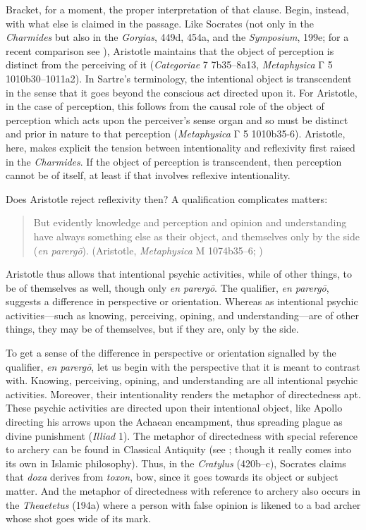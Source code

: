 Bracket, for a moment, the proper interpretation of that clause. Begin, instead, with what else is claimed in the passage. Like Socrates (not only in the \emph{Charmides} but also in the \emph{Gorgias}, 449d, 454a, and the \emph{Symposium}, 199e; for a recent comparison see \citealt[chapter 2]{Moss:2021aa}), Aristotle maintains that the object of perception is distinct from the perceiving of it (\emph{Categoriae} 7 7b35–8a13, \emph{Metaphysica} {\sbl Γ} 5 1010b30–1011a2). In Sartre's terminology, the intentional object is transcendent in the sense that it goes beyond the conscious act directed upon it. For Aristotle, in the case of perception, this follows from the causal role of the object of perception which acts upon the perceiver's sense organ and so must be distinct and prior in nature to that perception (\emph{Metaphysica} {\sbl Γ} 5 1010b35-6). Aristotle, here, makes explicit the tension between intentionality and reflexivity first raised in the \emph{Charmides}. If the object of perception is transcendent, then perception cannot be of itself, at least if that involves reflexive intentionality.

Does Aristotle reject reflexivity then? A qualification complicates matters:
\begin{quote}
 	But evidently knowledge and perception and opinion and understanding have always something else as their object, and themselves only by the side (\emph{en parergō}). (Aristotle, \emph{Metaphysica} {\sbl Μ} 1074b35–6; \citealt{Ross:1928ir})
\end{quote}
Aristotle thus allows that intentional psychic activities, while of other things, to be of themselves as well, though only \emph{en parergō}. The qualifier, \emph{en parergō}, suggests a difference in perspective or orientation. Whereas as intentional psychic activities—such as knowing, perceiving, opining, and understanding—are of other things, they may be of themselves, but if they are, only by the side.

To get a sense of the difference in perspective or orientation signalled by the qualifier, \emph{en parergō}, let us begin with the perspective that it is meant to contrast with. Knowing, perceiving, opining, and understanding are all intentional psychic activities. Moreover, their intentionality renders the metaphor of directedness apt. These psychic activities are directed upon their intentional object, like Apollo directing his arrows upon the Achaean encampment, thus spreading plague as divine punishment (\emph{Illiad} 1). The metaphor of directedness with special reference to archery can be found in Classical Antiquity (see \citealt{Solr-1668837}; though it really comes into its own in Islamic philosophy). Thus, in the \emph{Cratylus} (420b–c), Socrates claims that \emph{doxa} derives from \emph{toxon}, bow, since it goes towards its object or subject matter. And the metaphor of directedness with reference to archery also occurs in the \emph{Theaetetus} (194a) where a person with false opinion is likened to a bad archer whose shot goes wide of its mark.

